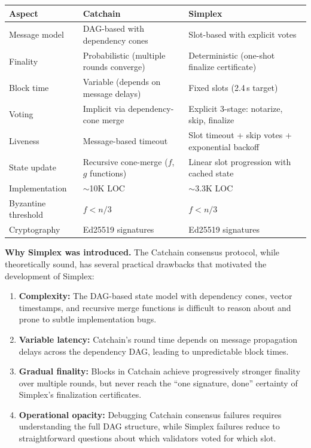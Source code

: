 \documentclass[12pt,oneside]{article}
\def\makepoint#1{\medbreak\noindent{\bf #1.\ }}
\def\nxpoint{\refstepcounter{subsection}%
  \smallbreak\makepoint{\thesubsection}}
\def\emb#1{\textbf{#1.}}
\begin{document}
\begin{center}
\begin{tabular}{|l|p{5.5cm}|p{5.5cm}|}
\hline
\textbf{Aspect} & \textbf{Catchain} & \textbf{Simplex} \\
\hline\hline
Message model & DAG-based with dependency cones & Slot-based with explicit votes \\
\hline
Finality & Probabilistic (multiple rounds converge) & Deterministic (one-shot finalize certificate) \\
\hline
Block time & Variable (depends on message delays) & Fixed slots (2.4\,s target) \\
\hline
Voting & Implicit via dependency-cone merge & Explicit 3-stage: notarize, skip, finalize \\
\hline
Liveness & Message-based timeout & Slot timeout + skip votes + exponential backoff \\
\hline
State update & Recursive cone-merge ($f$, $g$ functions) & Linear slot progression with cached state \\
\hline
Implementation & $\sim$10K LOC & $\sim$3.3K LOC \\
\hline
Byzantine threshold & $f < n/3$ & $f < n/3$ \\
\hline
Cryptography & Ed25519 signatures & Ed25519 signatures \\
\hline
\end{tabular}
\end{center}

\nxpoint\emb{Why Simplex was introduced}
The Catchain consensus protocol, while theoretically sound, has several practical drawbacks that motivated the development of Simplex:
\begin{enumerate}
\item {\bf Complexity:} The DAG-based state model with dependency cones, vector timestamps, and recursive merge functions is difficult to reason about and prone to subtle implementation bugs.
\item {\bf Variable latency:} Catchain's round time depends on message propagation delays across the dependency DAG, leading to unpredictable block times.
\item {\bf Gradual finality:} Blocks in Catchain achieve progressively stronger finality over multiple rounds, but never reach the ``one signature, done'' certainty of Simplex's finalization certificates.
\item {\bf Operational opacity:} Debugging Catchain consensus failures requires understanding the full DAG structure, while Simplex failures reduce to straightforward questions about which validators voted for which slot.
\end{enumerate}
\end{document}
